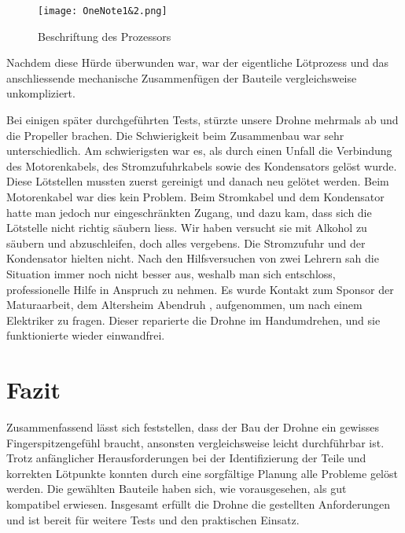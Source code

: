 \begin{figure}[h!]
\texttt{[image: OneNote1\&2.png]}
\caption{Beschriftung des Prozessors}
\label{fig:OneNote1&2}
\end{figure}
	
Nachdem diese Hürde überwunden war, war der eigentliche Lötprozess und das anschliessende mechanische Zusammenfügen der Bauteile vergleichsweise unkompliziert.

Bei einigen später durchgeführten Tests, stürzte unsere Drohne mehrmals ab und die Propeller brachen. Die Schwierigkeit beim Zusammenbau war sehr unterschiedlich. Am schwierigsten war es, als durch einen Unfall die Verbindung des Motorenkabels, des Stromzufuhrkabels sowie des Kondensators gelöst wurde. Diese Lötstellen mussten zuerst gereinigt und danach neu gelötet werden. Beim Motorenkabel war dies kein Problem. Beim Stromkabel und dem Kondensator hatte man jedoch nur eingeschränkten Zugang, und dazu kam, dass sich die Lötstelle nicht richtig säubern liess. Wir haben versucht sie mit Alkohol zu säubern und abzuschleifen, doch alles vergebens. Die Stromzufuhr und der Kondensator hielten nicht. Nach den Hilfsversuchen von zwei Lehrern sah die Situation immer noch nicht besser aus, weshalb man sich entschloss, professionelle Hilfe in Anspruch zu nehmen. Es wurde Kontakt zum Sponsor der Maturaarbeit, dem Altersheim Abendruh \cite{Altersheim}, aufgenommen, um nach einem Elektriker zu fragen. Dieser reparierte die Drohne im Handumdrehen, und sie funktionierte wieder einwandfrei.

\section{Fazit}

Zusammenfassend lässt sich feststellen, dass der Bau der Drohne ein gewisses Fingerspitzengefühl braucht, ansonsten vergleichsweise leicht durchführbar ist. Trotz anfänglicher Herausforderungen bei der Identifizierung der Teile und korrekten Lötpunkte konnten durch eine sorgfältige Planung alle Probleme gelöst werden.
Die gewählten Bauteile haben sich, wie vorausgesehen, als gut kompatibel erwiesen. Insgesamt erfüllt die Drohne die gestellten Anforderungen und ist bereit für weitere Tests und den praktischen Einsatz.








